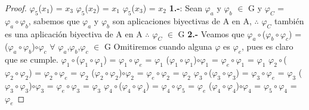 \documentclass[10pt,a4paper,oneside]{article}
\begin{document}
\begin{proof}
				\newline
				$\varphi_{5}$($x_{1}$) = $x_{3}$
				\newline
				$\varphi_{5}$($x_{2}$) = $x_{1}$
				\newline
				$\varphi_{5}$($x_{3}$) = $x_{2}$
				\newline
				\newline
				\textbf{1.-}:
				Sean $\varphi_{a}$ y  $\varphi_{b}$ $\in$ G y $\varphi_{C}$ = $\varphi_{a}\circ\varphi_{b}$, sabemos que $\varphi_{a}$ y $\varphi_{b}$ son aplicaciones biyectivas de A en A, $\therefore$ $\varphi_{C}$ también es una aplicación biyectiva de A en A $\therefore$ $\varphi_{C}$ $\in$ G
				\newline
				\newline
				\textbf{2.-}
				Veamos que $\varphi_{a}\circ$($\varphi_{b}\circ\varphi_{c}$) = ($\varphi_{a}\circ\varphi_{b}$)$\circ\varphi_{c}$ $\forall$ $\varphi_{a}$,$\varphi_{b}$,$\varphi_{c}$ $\in$ G
				\newline
				Omitiremos cuando alguna $\varphi$ es $\varphi_{e}$, pues es claro que se cumple.
				\newline
				$\varphi_{1}\circ$($\varphi_{1}\circ\varphi_{1}$) = $\varphi_{1}\circ\varphi_{e}$ = $\varphi_{1}$
				\newline
				($\varphi_{1}\circ\varphi_{1}$)$\circ\varphi_{1}$ = $\varphi_{e}\circ\varphi_{1}$ = $\varphi_{1}$
				\newline
				\newline
				$\varphi_{2}\circ$($\varphi_{2}\circ\varphi_{2}$) = $\varphi_{2}\circ\varphi_{e}$ = $\varphi_{2}$
				\newline
				($\varphi_{2}\circ\varphi_{2}$)$\circ\varphi_{2}$ = $\varphi_{e}\circ\varphi_{2}$ = $\varphi_{2}$
				\newline
				\newline
				$\varphi_{3}\circ$($\varphi_{3}\circ\varphi_{3}$) = $\varphi_{3}\circ\varphi_{e}$ = $\varphi_{3}$
				\newline
				($\varphi_{3}\circ\varphi_{3}$)$\circ\varphi_{3}$ = $\varphi_{e}\circ\varphi_{3}$ = $\varphi_{3}$
				\newline
				\newline
				$\varphi_{4}\circ$($\varphi_{4}\circ\varphi_{4}$) = $\varphi_{4}\circ\varphi_{5}$ = $\varphi_{e}$
				\newline
				($\varphi_{4}\circ\varphi_{4}$)$\circ\varphi_{4}$ = $\varphi_{5}\circ\varphi_{4}$ = $\varphi_{e}$
				\newline
				\newline

\end{proof}
\end{document}
